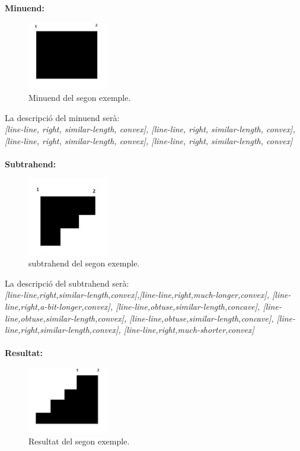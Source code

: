\documentclass{article}
\begin{document}
{\bf Minuend:}
\begin{figure}[!h]
\centering
\includegraphics[width=100pt]{images/quad_gran.jpg}
\caption {Minuend del segon exemple.}
\label {fig:quad_gran2}
\end{figure}

La descripció del minuend serà:
\\
\emph {[line-line, right, similar-length, convex], [line-line, right, similar-length, convex], [line-line, right, similar-length, convex], [line-line, right, similar-length, convex]}
\\
\\

{\bf Subtrahend:}
\begin{figure}[!h]
\centering
\includegraphics[width=100pt]{images/quad_escala.jpg}
\caption {subtrahend del segon exemple.}
\label {fig:quad_escala}
\end{figure}

La descripció del subtrahend serà:
\\
\emph {[line-line,right,similar-length,convex],[line-line,right,much-longer,convex], [line-line,right,a-bit-longer,convex], [line-line,obtuse,similar-length,concave], [line-line,obtuse,similar-length,convex], [line-line,obtuse,similar-length,concave], [line-line,right,similar-length,convex], [line-line,right,much-shorter,convex]}
\\
\\
{\bf Resultat:}
\begin{figure}[!h]
\centering
\includegraphics[width=100pt]{images/res2.jpg}
\caption {Resultat del segon exemple.}
\label {fig:res2}
\end{figure}
\end{document}
